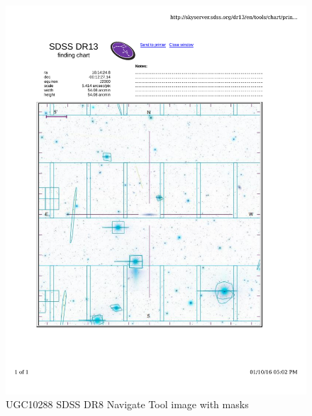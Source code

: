 \documentclass[10pt,letterpaper]{article}
\begin{document}
\begin{figure}[h!]
\centering
\includegraphics[scale=0.7]{figures/UGC10288.pdf}
\caption{UGC10288 SDSS DR8 Navigate Tool image with masks}
\end{figure}
\end{document}
